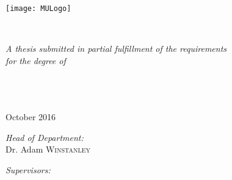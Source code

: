 \documentclass[
11pt, %
oneside, %
english, %
onehalfspacing, %
liststotoc, %
headsepline, %
]{MastersDoctoralThesis} %
\author{Andrew \textsc{Healy}} %
\begin{document}
\frontmatter %

\pagestyle{nohead} %


\begin{titlepage}
\begin{center}

\texttt{[image: MULogo]} %
\HRule \\[0.4cm] %
{\huge \bfseries \ttitle\par}\vspace{0.4cm} %
\HRule \\[1.5cm] %
{\huge \authorname}\vspace{0.6cm}

\large \textit{A thesis submitted in partial fulfillment of the requirements\\ for the degree of }\degreename\\[0.3cm]\vspace{0.8cm} %

{\scshape\Large \univname}\vspace{0.8cm} \\ %
\deptname\\\facname\\[2cm] %
October 2016\\ 
\vfill
\begin{minipage}[t]{0.4\textwidth}
\begin{flushleft} \large
\emph{Head of Department:} \\
Dr. Adam \textsc{Winstanley}
\end{flushleft}
\end{minipage}
\begin{minipage}[t]{0.4\textwidth}
\begin{flushright} \large
\emph{Supervisors:} \\
\supname %
\end{flushright}
\end{minipage}\\[3cm]

\end{center}
\end{titlepage}
\end{document}
